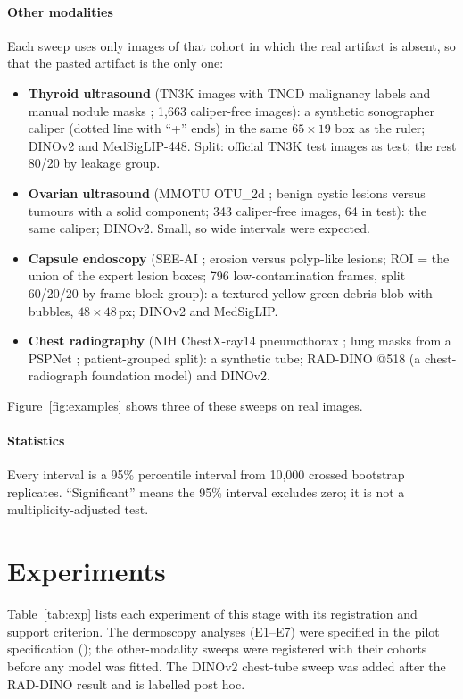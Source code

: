 \paragraph{Other modalities} Each sweep uses only images of that cohort in which the real artifact is absent, so that
the pasted artifact is the only one:
\begin{itemize}[leftmargin=*]\itemsep1pt
\item \textbf{Thyroid ultrasound} (TN3K images with TNCD malignancy labels and manual nodule masks \citep{gong2021tn3k};
1,663 caliper-free images): a synthetic sonographer caliper (dotted line with ``+'' ends) in the same $65\times19$ box
as the ruler; DINOv2 and MedSigLIP-448. Split: official TN3K test images as test; the rest 80/20 by leakage group.
\item \textbf{Ovarian ultrasound} (MMOTU OTU\_2d \citep{zhao2022mmotu}; benign cystic lesions versus tumours with a
solid component; 343 caliper-free images, 64 in test): the same caliper; DINOv2. Small, so wide intervals were
expected.
\item \textbf{Capsule endoscopy} (SEE-AI \citep{seeai2023}; erosion versus polyp-like lesions; ROI = the union of the
expert lesion boxes; 796 low-contamination frames, split 60/20/20 by frame-block group): a textured yellow-green debris
blob with bubbles, $48\times48$\,px; DINOv2 and MedSigLIP.
\item \textbf{Chest radiography} (NIH ChestX-ray14 pneumothorax \citep{wang2017chestxray8}; lung masks from a PSPNet
\citep{cohen2022xrv}; patient-grouped split): a synthetic tube; RAD-DINO @518 \citep{perezgarcia2025raddino} (a
chest-radiograph foundation model) and DINOv2.
\end{itemize}
Figure~\ref{fig:examples} shows three of these sweeps on real images.
\paragraph{Statistics} Every interval is a 95\% percentile interval from 10,000 crossed bootstrap replicates.
``Significant'' means the 95\% interval excludes zero; it is not a multiplicity-adjusted test.

\section{Experiments}
Table~\ref{tab:exp} lists each experiment of this stage with its registration and support criterion. The dermoscopy
analyses (E1--E7) were specified in the pilot specification (\sTwoRegRep); the other-modality sweeps were registered
with their cohorts before any model was fitted. The DINOv2 chest-tube sweep was added after the RAD-DINO result and is
labelled post hoc.


